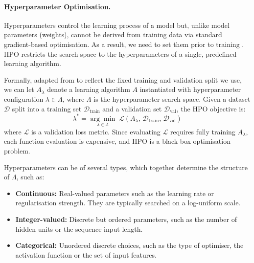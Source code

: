 \paragraph{Hyperparameter Optimisation.}
\label{subsubsection:HPO}
Hyperparameters control the learning process of a model but, unlike model parameters (weights), cannot be derived from training data via standard gradient-based optimisation. As a result, we need to set them prior to training \parencite{hutter2019automated}. \ac{HPO} restricts the search space to the hyperparameters of a single, predefined learning algorithm.


Formally, adapted from \textcite{AutoMLHoos} to reflect the fixed training and validation split we use, we can let $A_\lambda$ denote a learning algorithm $A$ instantiated with hyperparameter configuration $\lambda \in \Lambda$, where $\Lambda$ is the
hyperparameter search space. Given a dataset $\mathcal{D}$ split into a training set $\mathcal{D}_\text{train}$ and a validation set
$\mathcal{D}_\text{val}$, the \ac{HPO} objective is:
\begin{equation*}
    \lambda^* = \underset{\lambda \in \Lambda}{\arg\min}\;
    \mathcal{L}\!\left(A_\lambda,\, \mathcal{D}_\text{train},\,
    \mathcal{D}_\text{val}\right)
    \label{eq:hpo}
\end{equation*}
where $\mathcal{L}$ is a validation loss metric. Since evaluating $\mathcal{L}$ requires fully training $A_\lambda$, each function evaluation is expensive, and \ac{HPO} is a black-box optimisation problem.

Hyperparameters can be of several types, which together determine the structure of $\Lambda$, such as:
\begin{itemize}
    \item \textbf{Continuous:} Real-valued parameters such as the learning
    rate or regularisation strength. They are typically searched on a
    log-uniform scale.
    \item \textbf{Integer-valued:} Discrete but ordered parameters, such as
    the number of hidden units or the sequence input length.
    \item \textbf{Categorical:} Unordered discrete choices, such as the
    type of optimiser, the activation function or the set of input features.
\end{itemize}






